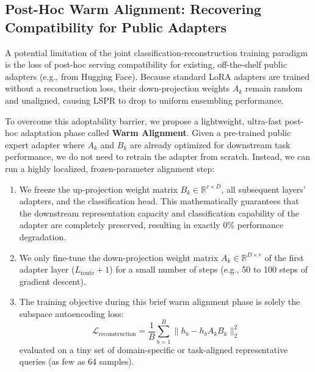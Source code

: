 \subsection{Post-Hoc Warm Alignment: Recovering Compatibility for Public Adapters}
\label{subsec:method_warm_alignment}

A potential limitation of the joint classification-reconstruction training paradigm is the loss of post-hoc serving compatibility for existing, off-the-shelf public adapters (e.g., from Hugging Face). Because standard LoRA adapters are trained without a reconstruction loss, their down-projection weights $A_k$ remain random and unaligned, causing LSPR to drop to uniform ensembling performance.

To overcome this adoptability barrier, we propose a lightweight, ultra-fast post-hoc adaptation phase called \textbf{Warm Alignment}. Given a pre-trained public expert adapter where $A_k$ and $B_k$ are already optimized for downstream task performance, we do not need to retrain the adapter from scratch. Instead, we can run a highly localized, frozen-parameter alignment step:
\begin{enumerate}
    \item We freeze the up-projection weight matrix $B_k \in \mathbb{R}^{r \times D}$, all subsequent layers' adapters, and the classification head. This mathematically guarantees that the downstream representation capacity and classification capability of the adapter are completely preserved, resulting in exactly 0\% performance degradation.
    \item We only fine-tune the down-projection weight matrix $A_k \in \mathbb{R}^{D \times r}$ of the first adapter layer ($L_{\text{route}}+1$) for a small number of steps (e.g., 50 to 100 steps of gradient descent).
    \item The training objective during this brief warm alignment phase is solely the subspace autoencoding loss:
    \begin{equation}
        \mathcal{L}_{\text{reconstruction}} = \frac{1}{B} \sum_{b=1}^B \parallel h_b - h_b A_k B_k \parallel_2^2
    \end{equation}
    evaluated on a tiny set of domain-specific or task-aligned representative queries (as few as 64 samples).
\end{enumerate}
